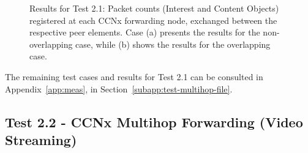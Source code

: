 \begin{figure}[h!]
    \centering



    \cprotect\caption{Results for Test 2.1: Packet counts (Interest and 
        Content Objects) registered at each CCNx forwarding node, exchanged 
        between the respective peer elements. Case (a) presents the results 
        for the non-overlapping case, while (b) shows the results for the 
        overlapping case.}
    \label{fig:file_5-pckt-counts}

\end{figure}

The remaining test cases and results for Test 2.1 can be consulted in 
Appendix~\ref{app:meas}, in Section~\ref{subapp:test-multihop-file}.

\subsection{Test 2.2 - CCNx Multihop Forwarding (Video Streaming)}
\label{subsec:test-multihop-video}

